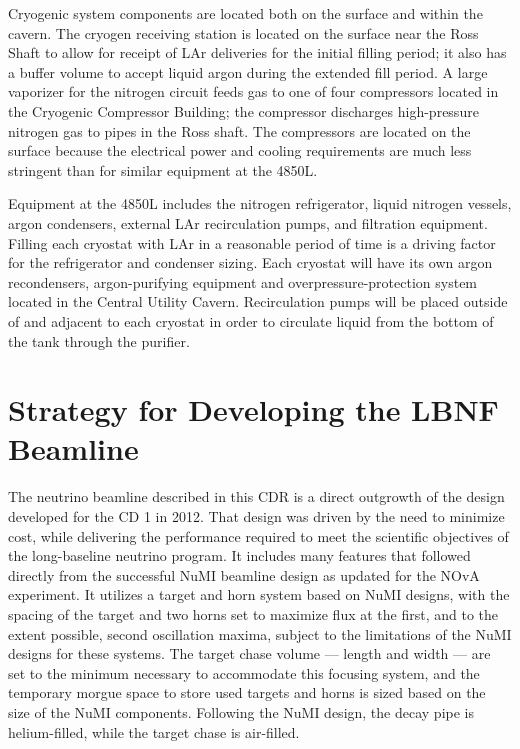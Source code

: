 Cryogenic system components are located both on the surface and within the cavern. The cryogen receiving station is located on the surface near the Ross Shaft to allow for receipt of LAr deliveries for the initial filling period; it also has a buffer volume to accept liquid argon during the extended fill period. A large vaporizer for the nitrogen circuit feeds gas to one of four compressors located in the Cryogenic Compressor Building; the compressor discharges high-pressure nitrogen gas to pipes in the Ross shaft. The compressors are located on the surface because the electrical power  and cooling requirements are much less stringent  than for similar equipment at the 4850L.  
 
Equipment at the 4850L includes the nitrogen refrigerator, liquid nitrogen vessels, argon condensers, external LAr recirculation pumps, and filtration equipment. Filling each cryostat with LAr in a reasonable period of time is a driving factor for the refrigerator and condenser sizing.  Each cryostat will have its own argon recondensers, argon-purifying equipment and overpressure-protection system located in the Central Utility Cavern. Recirculation pumps will be placed outside of and adjacent to each cryostat in order to circulate liquid from the bottom of the tank through the purifier.
 
\section{Strategy for Developing the LBNF Beamline}
 
The neutrino beamline described in this CDR is a direct outgrowth of the design~\cite{lbnecdr} developed for the 
CD 1 in 2012.  That design was driven by the need to minimize cost, while delivering the performance required to meet the scientific objectives of the long-baseline neutrino program.  It includes many features that followed directly from the 
successful NuMI beamline design as updated for the NOvA experiment.  It utilizes a target and horn system based on NuMI designs, with the spacing of the target and two horns set to maximize flux at the first, and to the extent possible, second 
oscillation maxima, subject to the limitations of  the NuMI designs for these systems.  The target chase volume --- length and width --- are set to the minimum necessary to accommodate this focusing system, and the temporary morgue space to store 
used targets and horns is sized based on the size of the NuMI components.  Following the NuMI design, the decay pipe is helium-filled, while the target chase is air-filled.  
 

